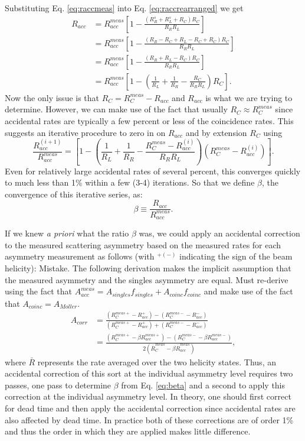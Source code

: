 \documentclass[12pt]{article}
\begin{document}
Substituting Eq. \ref{eq:raccmeas} into Eq. \ref{eq:raccrearranged} we get
\begin{align}
R_{acc}&=R_{acc}^{meas}\left[ 1-\frac{(R_R^s+R_L^s+R_C)R_C}{R_RR_L}\right]\\
             &=R_{acc}^{meas}\left[ 1- \frac{(R_R-R_C+R_L-R_C+R_C)R_C}{R_RR_L}\right]\\
             &=R_{acc}^{meas}\left[ 1- \frac{(R_R+R_L-R_C)R_C}{R_RR_L}\right]\\
             &=R_{acc}^{meas}\left[1-\left(\frac{1}{R_L}+ \frac{1}{R_R} - \frac{R_C}{R_RR_L}\right)R_C\right]\label{eq:beta}.
\end{align}
Now the only issue is that $R_C=R_C^{meas}-R_{acc}$ and $R_{acc}$ is what we are trying to determine. However, we can make use of the fact that usually $R_C\approx R_C^{meas}$ since accidental rates are typically a few percent or less of the coincidence rates. This suggests an iterative procedure to zero in on $R_{acc}$ and by extension $R_C$ using
\begin{equation}
\frac{R_{acc}^{(i+1)}}{R_{acc}^{meas}}=\left[1-\left(\frac{1}{R_L}+ \frac{1}{R_R} - \frac{R_C^{meas}-R_{acc}^{(i)}}{R_RR_L}\right)\left(R_C^{meas}-R_{acc}^{(i)}\right)\right].
\end{equation}
Even for relatively large accidental rates of several percent, this converges quickly to much less than 1\% within a few (3-4) iterations. So that we define $\beta$, the convergence of this iterative series, as:
\begin{equation}\label{eq:beta}
\beta\equiv\frac{R_{acc}}{R_{acc}^{meas}}.
\end{equation}

If we knew {\it a priori} what the ratio $\beta$ was, we could apply an accidental correction to the measured scattering asymmetry based on the measured rates for each asymmetry measurement as follows (with $^{+(-)}$ indicating the sign of the beam helicity): {\color{red} Mistake. The following derivation makes the implicit assumption that the measured asymmetry and the singles asymmetry are equal. Must re-derive using the fact that $A_{acc}^{meas}=A_{singles}f_{singles}+A_{coinc}f_{coinc}$ and make use of the fact that $A_{coinc}=A_{Moller}$. }
\begin{align}
A_{corr}&=\frac{(R_C^{meas +}-R_{acc}^{+})-(R_C^{meas -}-R_{acc}^{-})}{(R_C^{meas +}-R_{acc}^{+})+(R_C^{meas -}-R_{acc}^{-})}\\
&=\frac{(R_C^{meas +}-\beta R_{acc}^{meas +})-(R_C^{meas -}-\beta R_{acc}^{meas -})}{2(\bar{R}_C^{meas}-\beta\bar{R}_{acc}^{meas})}\label{eq:acorr},
\end{align}
where $\bar{R}$ represents the rate averaged over the two helicity states. Thus, an accidental correction of this sort at the individual asymmetry level requires two passes, one pass to determine $\beta$ from Eq. \ref{eq:beta} and a second to apply this correction at the individual asymmetry level.  In theory, one should first correct for dead time and then apply the accidental correction since accidental rates are also affected by dead time. In practice both of these corrections are of order 1\% and thus the order in which they are applied makes little difference. 
\end{document}
